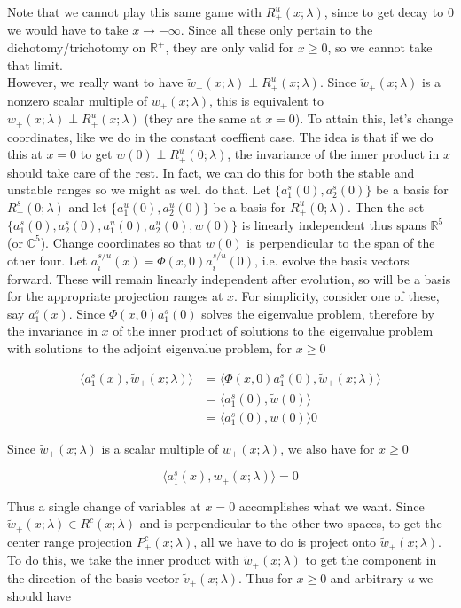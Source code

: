 \documentclass[12pt]{article}
\def\R{{\mathbb R}}
\def\C{{\mathbb C}}
\begin{document}
Note that we cannot play this same game with $R^u_+(x; \lambda)$, since to get decay to 0 we would have to take $x \rightarrow -\infty$. Since all these only pertain to the dichotomy/trichotomy on $\R^+$, they are only valid for $x \geq 0$, so we cannot take that limit.\\

However, we really want to have $\tilde{w}_+(x; \lambda) \perp R^u_+(x; \lambda)$. Since $\tilde{w}_+(x; \lambda)$ is a nonzero scalar multiple of $w_+(x; \lambda)$, this is equivalent to $w_+(x; \lambda) \perp R^u_+(x; \lambda)$ (they are the same at $x = 0$). To attain this, let's change coordinates, like we do in the constant coeffient case. The idea is that if we do this at $x = 0$ to get $w(0) \perp R^u_+(0; \lambda)$, the invariance of the inner product in $x$ should take care of the rest. In fact, we can do this for both the stable and unstable ranges so we might as well do that. Let $\{ a^s_1(0), a^s_2(0)\}$ be a basis for $R^s_+(0; \lambda)$ and let $\{a^u_1(0), a^u_2(0)\}$ be a basis for $R^u_+(0; \lambda)$. Then the set $\{ a^s_1(0), a^s_2(0),a^u_1(0), a^u_2(0), w(0) \}$ is linearly independent thus spans $\R^5$ (or $\C^5$). Change coordinates so that $w(0)$ is perpendicular to the span of the other four. Let $a^{s/u}_i(x) = \Phi(x,0)a^{s/u}_i(0)$, i.e. evolve the basis vectors forward. These will remain linearly independent after evolution, so will be a basis for the appropriate projection ranges at $x$. For simplicity, consider one of these, say $a^s_1(x)$. Since $\Phi(x,0) a^s_1(0)$ solves the eigenvalue problem, therefore by the invariance in $x$ of the inner product of solutions to the eigenvalue problem with solutions to the adjoint eigenvalue problem, for $x \geq 0$

\begin{align*}
\langle a^s_1(x), \tilde{w}_+(x; \lambda) \rangle &= \langle \Phi(x,0) a^s_1(0), \tilde{w}_+(x; \lambda) \rangle \\
&= \langle a^s_1(0), \tilde{w}(0) \rangle \\
&= \langle a^s_1(0), w(0) \rangle 0
\end{align*}

Since $\tilde{w}_+(x; \lambda)$ is a scalar multiple of $w_+(x; \lambda)$, we also have for $x \geq 0$

\[
\langle a^s_1(x), w_+(x; \lambda) \rangle = 0
\]

Thus a single change of variables at $x = 0$ accomplishes what we want. Since $\tilde{w}_+(x; \lambda) \in R^c(x; \lambda)$ and is perpendicular to the other two spaces, to get the center range projection $P^c_+(x; \lambda)$, all we have to do is project onto $\tilde{w}_+(x; \lambda)$. To do this, we take the inner product with $\tilde{w}_+(x; \lambda)$ to get the component in the direction of the basis vector $\tilde{v}_+(x; \lambda)$. Thus for $x \geq 0$ and arbitrary $u$ we should have
\end{document}
